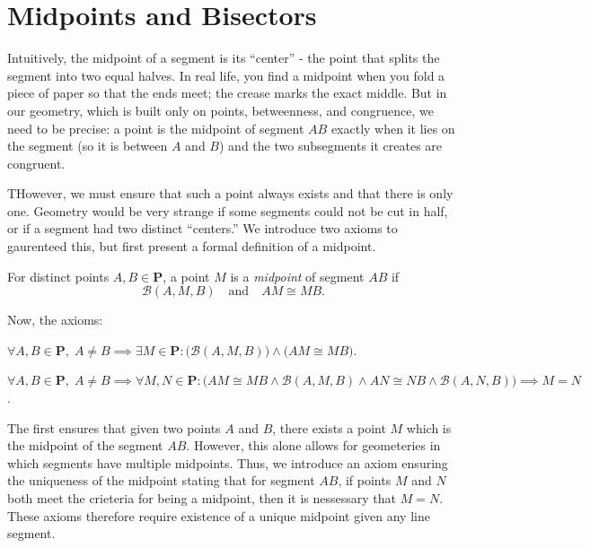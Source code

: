 \documentclass[../../../main/main.tex]{subfiles}
\begin{document}
\section{Midpoints and Bisectors}

Intuitively, the midpoint of a segment is its “center” - the point that splits the segment into two equal halves. In real life, you find a midpoint when you fold a piece of paper so that the ends meet; the crease marks the exact middle. But in our geometry, which is built only on points, betweenness, and congruence, we need to be precise: a point is the midpoint of segment $AB$ exactly when it lies on the segment (so it is between $A$ and $B$) and the two subsegments it creates are congruent.

THowever, we must ensure that such a point always exists and that there is only one. Geometry would be very strange if some segments could not be cut in half, or if a segment had two distinct “centers.” We introduce two axioms to gaurenteed this, but first present a formal definition of a midpoint.

\begin{definition}[Midpoint]
  For distinct points $A,B\in\mathbf{P}$, a point $M$ is a \textit{midpoint} of segment $AB$ if
  \[
  \mathcal{B}(A,M,B) \quad\text{and}\quad AM \cong MB .
  \]
\end{definition}

Now, the axioms:

\begin{axiom}
  $\forall A,B\in\mathbf{P},\; A\neq B \implies \exists M\in\mathbf{P}:
  \bigl(\mathcal{B}(A,M,B)\bigr) \land \bigl(AM \cong MB\bigr)$.
\end{axiom}

\begin{axiom}
  $\forall A,B\in\mathbf{P},\; A\neq B \implies
  \forall M,N\in\mathbf{P}:
  \bigl( AM \cong MB \land \mathcal{B}(A,M,B) \land AN \cong NB \land \mathcal{B}(A,N,B) \bigr)
  \implies M = N$.
\end{axiom}

The first ensures that given two points $A$ and $B$, there exists  a point $M$ which is the midpoint of the segment $AB$. However, this alone allows for geometeries in which segments have multiple midpoints. Thus, we introduce an axiom ensuring the uniqueness of the midpoint stating that for segment $AB$,  if points $M$ and $N$ both meet the crieteria for being a midpoint, then it is nessessary that $M = N$. These axioms therefore require existence of a unique midpoint given any line segment.
\end{document}
